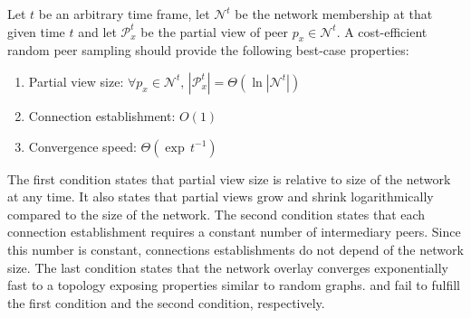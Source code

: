 \begin{problem}
  Let $t$ be an arbitrary time frame, let $\mathcal{N}^t$ be the
  network membership at that given time $t$ and let $\mathcal{P}_x^t$
  be the partial view of peer $p_x \in \mathcal{N}^t$.  A
  cost-efficient random peer sampling should provide the following
  best-case properties:
  \begin{enumerate}
  \item  \begin{center}
    Partial view size: \hfill
    $\forall p_x \in \mathcal{N}^t,\, |\mathcal{P}_x^t| = \Theta (\ln
    |\mathcal{N}^t|)$
  \end{center}
  
\item \begin{center}
    Connection establishment: \hfill $O(1)$
  \end{center}
 
\item  \begin{center}
    Convergence speed: \hfill $\Theta(\exp \, t^{-1})$
  \end{center}
  \end{enumerate}
\end{problem}

The first condition states that partial view size is relative to size of the
network at any time. It also states that partial views grow and shrink
logarithmically compared to the size of the network. The second condition
states that each connection establishment requires a constant number of
intermediary peers. Since this number is constant, connections establishments
do not depend of the network size. The last condition states that the network
overlay converges exponentially fast to a topology exposing properties similar
to random graphs.  \CYCLON{} and \SCAMP{} fail to fulfill the first condition
and the second condition, respectively.

